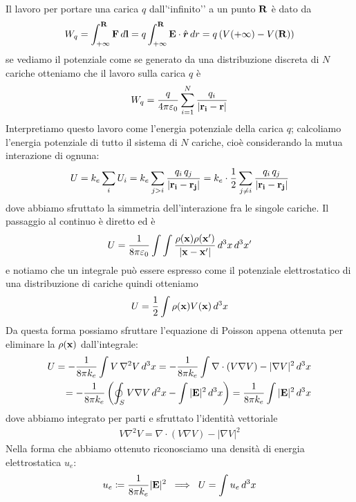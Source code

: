 Il lavoro per portare una carica $ q $ dall'`infinito'' a un punto $ \mathbf{R} $ è dato da
\begin{align}
  W_q = \int_{+\infty}^{\mathbf{R}} \mathbf{F} \,d\mathbf{l} = q \int_{+\infty}^{\mathbf{R}} \mathbf{E}\cdot \hat{\boldsymbol{r}} \,dr = q \left( V(+\infty) - V(\mathbf{R}) \right)
\end{align}
se vediamo il potenziale come se generato da una distribuzione discreta di $ N $ cariche otteniamo che il lavoro sulla carica $ q $ è 
\begin{align}
  W_q = \frac{q}{4\pi \varepsilon_0} \sum_{i= 1}^N \frac{q_i}{|\mathbf{r_i - r}|}
\end{align}
Interpretiamo questo lavoro come l'energia potenziale della carica $ q $; calcoliamo l'energia potenziale di tutto il sistema di $ N $ cariche, cioè 
considerando la mutua interazione di ognuna:
\begin{align}
  U = k_e \sum_{i} U_i = k_e \sum_{j > i} \frac{q_i\, q_j}{|\mathbf{r_i - r_j}|} 
  = k_e \cdot \frac{1}{2} \sum_{j \neq i} \frac{q_i\, q_j}{|\mathbf{r_i - r_j}|}
\end{align}
dove abbiamo sfruttato la simmetria dell'interazione fra le singole cariche. Il passaggio al continuo è diretto ed è
\begin{align}
  U = \frac{1}{8\pi\varepsilon_0} \int \int \frac{\rho(\mathbf{x}) \rho(\mathbf{x'})}{|\mathbf{x - x'}|} \,d^3x \,d^3x'
\end{align}
e notiamo che un integrale può essere espresso come il potenziale elettrostatico di una distribuzione di cariche quindi otteniamo
\begin{align}
  U = \frac{1}{2} \int \rho(\mathbf{x}) V(\mathbf{x}) \,d^3x
\end{align}
Da questa forma possiamo sfruttare l'equazione di Poisson appena ottenuta per eliminare la $ \rho(\mathbf{x}) $ dall'integrale:
\begin{align}
  U = -\frac1{8\pi k_e} \int V\, \nabla^2V \,d^3x = -\frac1{8\pi k_e} \int \nabla \cdot (V \nabla V) - |\nabla V|^2 \,d^3x 
  \\
  = -\frac1{8\pi k_e} \left( \oint_S V\nabla V \,d^2x -\int |\mathbf{E}|^2 \,d^3x \right) = \frac1{8\pi k_e} \int |\mathbf{E}|^2 \,d^3x
\end{align}
dove abbiamo integrato per parti e sfruttato l'identità vettoriale
\begin{align}
  V \nabla^2V = \nabla \cdot (V \nabla V) - |\nabla V|^2
\end{align}
Nella forma che abbiamo ottenuto riconosciamo una densità di energia elettrostatica $ u_e $:
\begin{align}
  u_e \coloneq \frac1{8\pi k_e} |\mathbf{E}|^2 \; \implies \;
  U = \int u_e \,d^3x
\end{align}
